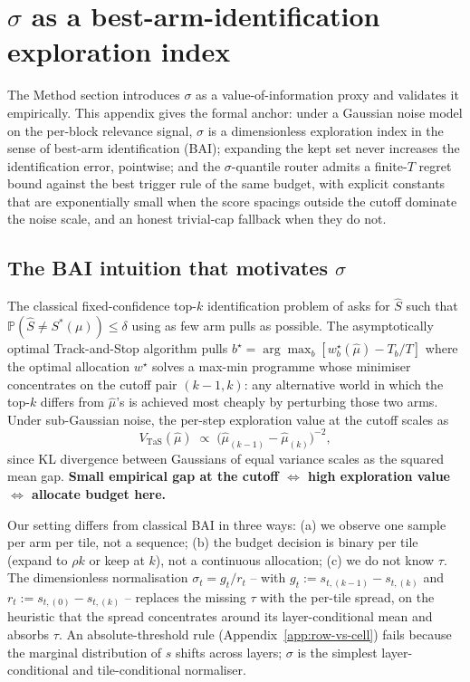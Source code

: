 \documentclass[11pt]{article}
\theoremstyle{remark}
\begin{document}
\section{$\sigma$ as a best-arm-identification exploration index}\label{app:bai}

The Method section introduces $\sigma$ as a value-of-information proxy and validates it empirically. This appendix gives the formal anchor: under a Gaussian noise model on the per-block relevance signal, $\sigma$ is a dimensionless exploration index in the sense of best-arm identification (BAI); expanding the kept set never increases the identification error, pointwise; and the $\sigma$-quantile router admits a finite-$T$ regret bound against the best trigger rule of the same budget, with explicit constants that are exponentially small when the score spacings outside the cutoff dominate the noise scale, and an honest trivial-cap fallback when they do not.

\subsection{The BAI intuition that motivates $\sigma$}\label{app:bai:intuition}

The classical fixed-confidence top-$k$ identification problem of \citet{kaufmann2016complexity, garivier2016optimal} asks for $\widehat S$ such that $\mathbb P(\widehat S \ne S^*(\mu)) \le \delta$ using as few arm pulls as possible. The asymptotically optimal Track-and-Stop algorithm pulls $b^\star = \arg\max_b [w^\star_b(\hat\mu) - T_b/T]$ where the optimal allocation $w^\star$ solves a max-min programme whose minimiser concentrates on the cutoff pair $(k{-}1, k)$: any alternative world in which the top-$k$ differs from $\hat\mu$'s is achieved most cheaply by perturbing those two arms. Under sub-Gaussian noise, the per-step exploration value at the cutoff scales as
\begin{equation}\label{eq:tas-value}
V_{\text{TaS}}(\hat\mu) \;\propto\; \bigl(\hat\mu_{(k-1)} - \hat\mu_{(k)}\bigr)^{-2},
\end{equation}
since KL divergence between Gaussians of equal variance scales as the squared mean gap. \textbf{Small empirical gap at the cutoff $\Longleftrightarrow$ high exploration value $\Longleftrightarrow$ allocate budget here.}

Our setting differs from classical BAI in three ways: (a) we observe one sample per arm per tile, not a sequence; (b) the budget decision is binary per tile (expand to $\rho k$ or keep at $k$), not a continuous allocation; (c) we do not know $\tau$. The dimensionless normalisation $\sigma_t = g_t / r_t$ -- with $g_t := s_{t,(k-1)} - s_{t,(k)}$ and $r_t := s_{t,(0)} - s_{t,(k)}$ -- replaces the missing $\tau$ with the per-tile spread, on the heuristic that the spread concentrates around its layer-conditional mean and absorbs $\tau$. An absolute-threshold rule (Appendix~\ref{app:row-vs-cell}) fails because the marginal distribution of $s$ shifts across layers; $\sigma$ is the simplest layer-conditional and tile-conditional normaliser.
\end{document}
